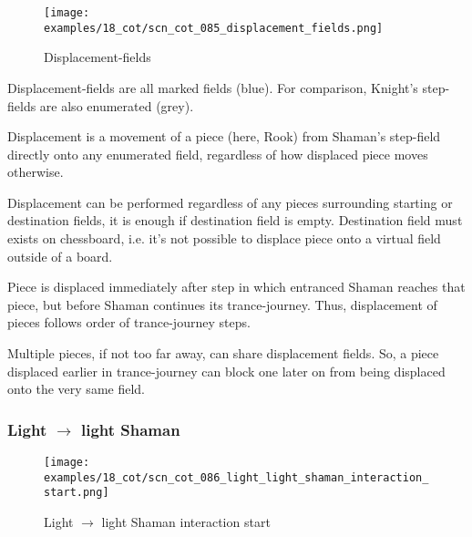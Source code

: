 \vspace*{-1.5\baselineskip}
\noindent
\begin{figure}[!h]
\texttt{[image: examples/18\_cot/scn\_cot\_085\_displacement\_fields.png]}
\caption{Displacement-fields}
\label{fig:scn_cot_085_displacement_fields}
\end{figure}

Displacement-fields are all marked fields (blue). For comparison, Knight's
step-fields are also enumerated (grey).

Displacement is a movement of a piece (here, Rook) from Shaman's step-field directly
onto any enumerated field, regardless of how displaced piece moves otherwise.

Displacement can be performed regardless of any pieces surrounding starting or
destination fields, it is enough if destination field is empty. Destination field
must exists on chessboard, i.e. it's not possible to displace piece onto a virtual
field outside of a board.

Piece is displaced immediately after step in which entranced Shaman reaches that
piece, but before Shaman continues its trance-journey. Thus, displacement of pieces
follows order of trance-journey steps.

Multiple pieces, if not too far away, can share displacement fields. So, a piece
displaced earlier in trance-journey can block one later on from being displaced
onto the very same field.

\clearpage %

\subsubsection*{Light $\rightarrow$ light Shaman}
\label{sec:Conquest of Tlalocan/Trance-journey/Interactions/Light --> light Shaman}

\vspace*{-1.2\baselineskip}
\noindent
\begin{figure}[!h]
\texttt{[image: examples/18\_cot/scn\_cot\_086\_light\_light\_shaman\_interaction\_start.png]}
\caption{Light $\rightarrow$ light Shaman interaction start}
\label{fig:scn_cot_086_light_light_shaman_interaction_start}
\end{figure}

